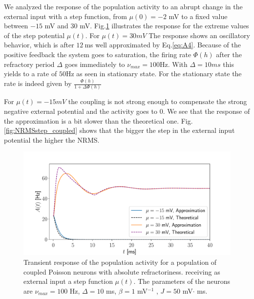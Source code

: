 \documentclass[12pt,twoside]{report}
\begin{document}
We analyzed the response of the population activity to an abrupt change in the external input with a step function, from $\mu(0)=-2$ mV to a fixed value between $-15$ mV and $30$ mV. Fig.\ref{fig:Astep_coupled}  illustrates the response for the extreme values of the step potential $\mu(t)$. For $\mu(t)=30mV$ The response shows an oscillatory behavior, which is after $12\:$ms well approximated by Eq.\eqref{eq:A4}.  Because of the positive feedback the system goes to saturation, the firing rate $\Phi(h)$ after the refractory period $\Delta$ goes immediately to $\nu_{max}=100$Hz. With $\Delta=10ms$ this yields to a rate of $50$Hz as seen in stationary state. For the stationary state the rate is indeed given by $\frac{\Phi(h)}{1+\Delta \Phi(h)}$


 For $\mu(t)=-15mV$ the coupling is not strong enough to compensate the strong negative external potential and the activity goes to $0$. We see that the response of the approximation is a bit slower than the theoretical one. Fig.\ref{fig:NRMSstep_coupled} shows that the bigger the step in the external input potential the higher the NRMS.


\begin{figure}[h!]
	\centering
	\includegraphics[width=0.8\linewidth]{Astep_coupled.pdf}
	\caption{Transient response of the population activity for a population of coupled Poisson neurons with absolute refractoriness. receiving as external input a step function $\mu(t)$. The parameters of the neurons are $\nu_{max}=100$ Hz, $\Delta=10$ ms, $\beta=1$ mV$^{-1}$ , $J=50$ mV$\cdot$ ms.
	}
	\label{fig:Astep_coupled}
\end{figure}
\end{document}

